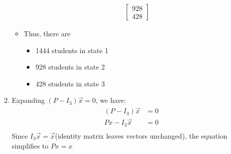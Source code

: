 \documentclass{article}
\begin{document}
\begin{enumerate}[label = ({\alph*})]
\begin{itemize}
\begin{align*}
\begin{bmatrix}
                            928 \\
                            428
                        \end{bmatrix}
                    \end{align*}
                    \item Thus, there are
                    \begin{itemize}
                        \item 1444 students in state 1
                        \item 928 students in state 2
                        \item 428 students in state 3
                    \end{itemize}
            \end{itemize}
            \item Expanding \((P - I_{3})\vec{x} = 0\), we have:
            \begin{align*}
                (P - I_3)\vec{x} &= 0 \\
                Px - I_{3}\vec{x} &= 0 \\
            \end{align*}
            Since \(I_{3}\vec{x} = \vec{x}\)(identity matrix leaves vectors unchanged), the equation simplifies to \(Px = x\)


\end{enumerate}
\end{document}
